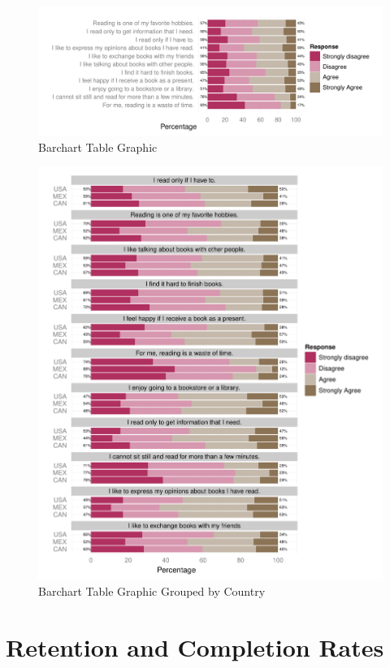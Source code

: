 \documentclass[letterpaper,11pt]{article}
\begin{document}
\begin{figure}
\begin{center}
\includegraphics{irutils-PISAItem28BarchartTable1}
\caption{Barchart Table Graphic}
\label{fig:PISAItem28BarchartTable1}
\end{center}
\end{figure}

\begin{figure}
\begin{center}
\includegraphics{irutils-PISAItem28BarchartTable2}
\caption{Barchart Table Graphic Grouped by Country}
\label{fig:PISAItem28BarchartTable2}
\end{center}
\end{figure}


\section{Retention and Completion Rates}


\clearpage


\end{document}
